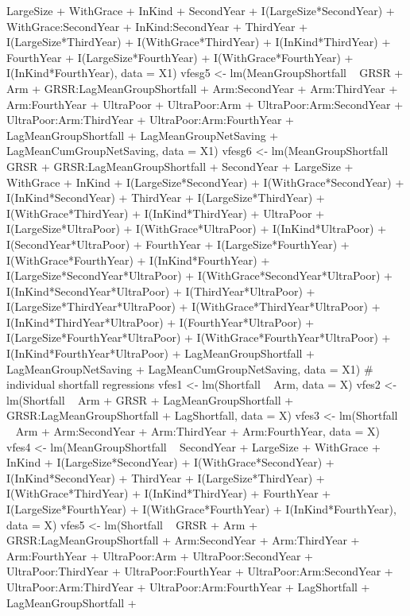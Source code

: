 \begin{Schunk}
\begin{Sinput}
  LargeSize + WithGrace + InKind + 
  SecondYear +
  I(LargeSize*SecondYear) + WithGrace:SecondYear + InKind:SecondYear + 
  ThirdYear +
  I(LargeSize*ThirdYear) + I(WithGrace*ThirdYear) + I(InKind*ThirdYear) +
  FourthYear +
  I(LargeSize*FourthYear) + I(WithGrace*FourthYear) + I(InKind*FourthYear),
  data = X1)
vfesg5 <- lm(MeanGroupShortfall ~ 
  GRSR + Arm + GRSR:LagMeanGroupShortfall + 
  Arm:SecondYear + Arm:ThirdYear  + Arm:FourthYear + 
  UltraPoor + UltraPoor:Arm + 
  UltraPoor:Arm:SecondYear + UltraPoor:Arm:ThirdYear  + UltraPoor:Arm:FourthYear +
  LagMeanGroupShortfall +
  LagMeanGroupNetSaving + LagMeanCumGroupNetSaving,
  data = X1)
vfesg6 <- lm(MeanGroupShortfall ~ 
  GRSR + GRSR:LagMeanGroupShortfall + 
  SecondYear + LargeSize + WithGrace + InKind +
  I(LargeSize*SecondYear) + I(WithGrace*SecondYear) + I(InKind*SecondYear) + 
  ThirdYear +
  I(LargeSize*ThirdYear) + I(WithGrace*ThirdYear) + I(InKind*ThirdYear) +
  UltraPoor + 
  I(LargeSize*UltraPoor) + I(WithGrace*UltraPoor) + I(InKind*UltraPoor) + 
  I(SecondYear*UltraPoor) +
  FourthYear +
  I(LargeSize*FourthYear) + I(WithGrace*FourthYear) + I(InKind*FourthYear) +
  I(LargeSize*SecondYear*UltraPoor) + I(WithGrace*SecondYear*UltraPoor) + 
  I(InKind*SecondYear*UltraPoor) + 
  I(ThirdYear*UltraPoor) +
  I(LargeSize*ThirdYear*UltraPoor) + I(WithGrace*ThirdYear*UltraPoor) + 
  I(InKind*ThirdYear*UltraPoor) + 
  I(FourthYear*UltraPoor) +
  I(LargeSize*FourthYear*UltraPoor) + I(WithGrace*FourthYear*UltraPoor) + 
  I(InKind*FourthYear*UltraPoor) + 
  LagMeanGroupShortfall +
  LagMeanGroupNetSaving + LagMeanCumGroupNetSaving,
  data = X1)
# individual shortfall regressions
vfes1 <- lm(Shortfall  ~ Arm, data = X)
vfes2 <- lm(Shortfall  ~ Arm +
  GRSR + LagMeanGroupShortfall + GRSR:LagMeanGroupShortfall
  + LagShortfall, data = X)
vfes3 <- lm(Shortfall  ~ 
  Arm + Arm:SecondYear + Arm:ThirdYear + Arm:FourthYear, 
  data = X)
vfes4 <- lm(MeanGroupShortfall ~  
  SecondYear + LargeSize + WithGrace + InKind +
  I(LargeSize*SecondYear) + I(WithGrace*SecondYear) + I(InKind*SecondYear) + 
  ThirdYear +
  I(LargeSize*ThirdYear) + I(WithGrace*ThirdYear) + I(InKind*ThirdYear) +
  FourthYear +
  I(LargeSize*FourthYear) + I(WithGrace*FourthYear) + I(InKind*FourthYear),
  data = X)
vfes5 <- lm(Shortfall ~ 
  GRSR + Arm + GRSR:LagMeanGroupShortfall + 
  Arm:SecondYear + Arm:ThirdYear + Arm:FourthYear +
  UltraPoor:Arm + 
  UltraPoor:SecondYear + UltraPoor:ThirdYear + UltraPoor:FourthYear +
  UltraPoor:Arm:SecondYear + UltraPoor:Arm:ThirdYear + UltraPoor:Arm:FourthYear +
  LagShortfall + LagMeanGroupShortfall +

\end{Sinput}
\end{Schunk}
